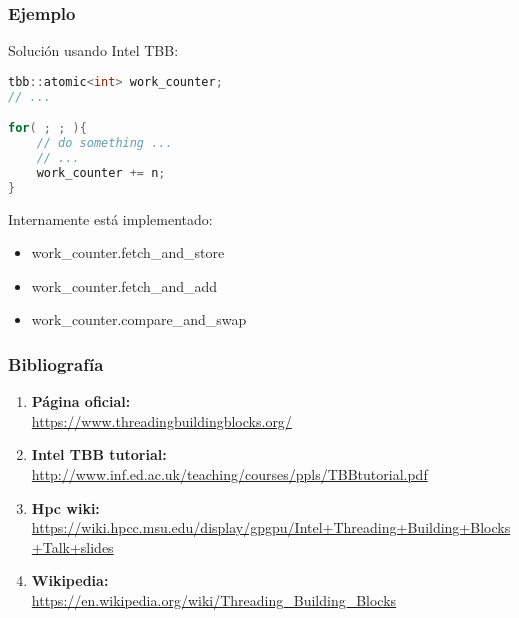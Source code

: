 \documentclass[10pt]{beamer}
\begin{document}
\begin{frame}[fragile] %
  \frametitle{Ejemplo}
  \alert{Solución} usando Intel TBB:

  \begin{lstlisting}[language=C++, frame=single]
tbb::atomic<int> work_counter;
// ...

for( ; ; ){
    // do something ...
    // ...
    work_counter += n;
}
  \end{lstlisting}
  Internamente está implementado:
  \begin{itemize}
  \item work\_counter.fetch\_and\_store
  \item work\_counter.fetch\_and\_add
  \item work\_counter.compare\_and\_swap
  \end{itemize}
\end{frame}

\begin{frame}
  \frametitle{Bibliografía}
  
  \begin{enumerate}
  \item \textbf{Página oficial:}\\\url{https://www.threadingbuildingblocks.org/}
  \item \textbf{Intel TBB tutorial:}\\\url{http://www.inf.ed.ac.uk/teaching/courses/ppls/TBBtutorial.pdf}
  \item \textbf{Hpc wiki:}\\\url{https://wiki.hpcc.msu.edu/display/gpgpu/Intel+Threading+Building+Blocks+Talk+slides}
  \item \textbf{Wikipedia:}\\\url{https://en.wikipedia.org/wiki/Threading_Building_Blocks}
  \end{enumerate}
\end{frame}
\end{document}

